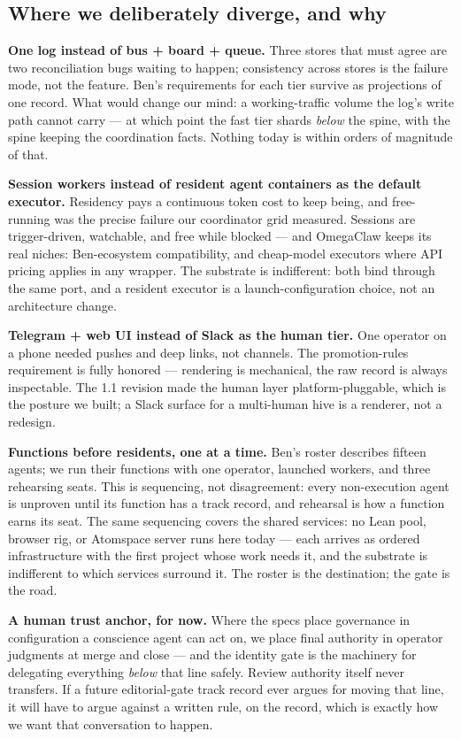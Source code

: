 \subsection{Where we deliberately diverge, and why}

\textbf{One log instead of bus + board + queue.} Three stores that must agree are two reconciliation bugs waiting to happen; consistency across stores is the failure mode, not the feature. Ben's requirements for each tier survive as projections of one record. What would change our mind: a working-traffic volume the log's write path cannot carry --- at which point the fast tier shards \emph{below} the spine, with the spine keeping the coordination facts. Nothing today is within orders of magnitude of that.

\textbf{Session workers instead of resident agent containers as the default executor.} Residency pays a continuous token cost to keep being, and free-running was the precise failure our coordinator grid measured. Sessions are trigger-driven, watchable, and free while blocked --- and OmegaClaw keeps its real niches: Ben-ecosystem compatibility, and cheap-model executors where API pricing applies in any wrapper. The substrate is indifferent: both bind through the same port, and a resident executor is a launch-configuration choice, not an architecture change.

\textbf{Telegram + web UI instead of Slack as the human tier.} One operator on a phone needed pushes and deep links, not channels. The promotion-rules requirement is fully honored --- rendering is mechanical, the raw record is always inspectable. The 1.1 revision made the human layer platform-pluggable, which is the posture we built; a Slack surface for a multi-human hive is a renderer, not a redesign.

\textbf{Functions before residents, one at a time.} Ben's roster describes fifteen agents; we run their functions with one operator, launched workers, and three rehearsing seats. This is sequencing, not disagreement: every non-execution agent is unproven until its function has a track record, and rehearsal is how a function earns its seat. The same sequencing covers the shared services: no Lean pool, browser rig, or Atomspace server runs here today --- each arrives as ordered infrastructure with the first project whose work needs it, and the substrate is indifferent to which services surround it. The roster is the destination; the gate is the road.

\textbf{A human trust anchor, for now.} Where the specs place governance in configuration a conscience agent can act on, we place final authority in operator judgments at merge and close --- and the identity gate is the machinery for delegating everything \emph{below} that line safely. Review authority itself never transfers. If a future editorial-gate track record ever argues for moving that line, it will have to argue against a written rule, on the record, which is exactly how we want that conversation to happen.

